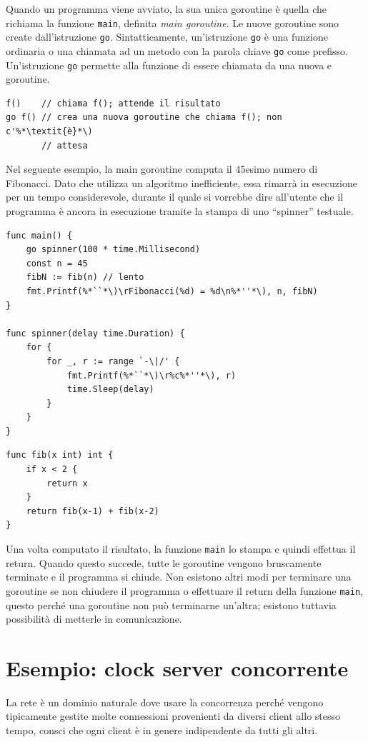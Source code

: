 Quando un programma viene avviato, la sua unica goroutine è quella che richiama la funzione \verb|main|, definita \textit{main goroutine}.
Le nuove goroutine sono create dall'istruzione \verb|go|.
Sintatticamente, un'istruzione \verb|go| è una funzione ordinaria o una chiamata ad un metodo con la parola chiave \verb|go| come prefisso.
Un'istruzione \verb|go| permette alla funzione di essere chiamata da una nuova e goroutine.
\begin{lstlisting}[frame=single, label={lst:lstlisting7-1.1}]
f()    // chiama f(); attende il risultato
go f() // crea una nuova goroutine che chiama f(); non c'%*\textit{è}*\)
       // attesa
\end{lstlisting}
Nel seguente esempio, la main goroutine computa il 45esimo numero di Fibonacci.
Dato che utilizza un algoritmo inefficiente, essa rimarrà in esecuzione per un tempo considerevole, durante il quale si vorrebbe dire all'utente che il programma è ancora in esecuzione tramite la stampa di uno ``spinner'' testuale.
\begin{lstlisting}[frame=single, label={lst:lstlisting7-1.2}]
func main() {
    go spinner(100 * time.Millisecond)
    const n = 45
    fibN := fib(n) // lento
    fmt.Printf(%*``*\)\rFibonacci(%d) = %d\n%*''*\), n, fibN)
}

func spinner(delay time.Duration) {
    for {
        for _, r := range `-\|/' {
            fmt.Printf(%*``*\)\r%c%*''*\), r)
            time.Sleep(delay)
        }
    }
}
\end{lstlisting}
\begin{lstlisting}[frame=single, label={lst:lstlisting7-1.3}]
func fib(x int) int {
    if x < 2 {
        return x
    }
    return fib(x-1) + fib(x-2)
}
\end{lstlisting}
Una volta computato il risultato, la funzione \verb|main| lo stampa e quindi effettua il return.
Quando questo succede, tutte le goroutine vengono bruscamente terminate e il programma si chiude.
Non esistono altri modi per terminare una goroutine se non chiudere il programma o effettuare il return della funzione \verb|main|, questo perché una goroutine non può terminarne un'altra;
esistono tuttavia possibilità di metterle in comunicazione.


\section{Esempio: clock server concorrente}
\label{sec:esempio_clock_server_concorrente}%
La rete è un dominio naturale dove usare la concorrenza perché vengono tipicamente gestite molte connessioni provenienti da diversi client allo stesso tempo, consci che ogni client è in genere indipendente da tutti gli altri.

